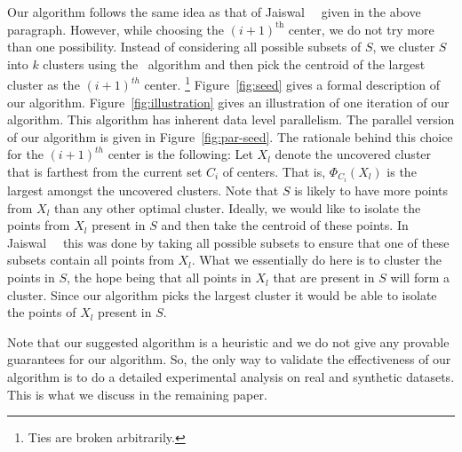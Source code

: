 \noindent
Our algorithm follows the same idea as that of Jaiswal~\etal\ \cite{jks} given in the above paragraph. 
However, while choosing the $(i+1)^{\textrm{th}}$ center, we do not try more than one possibility.
Instead of considering all possible subsets of $S$, we cluster $S$ into $k$ clusters using the \kmpp\ algorithm and then pick the centroid of the largest cluster as the $(i+1)^{th}$ center. 
\footnote{Ties are broken arbitrarily.}
Figure~\ref{fig:seed} gives a formal description of our algorithm. 
Figure~\ref{fig:illustration} gives an illustration of one iteration of our algorithm.
This algorithm has inherent data level parallelism. 
The parallel version of our algorithm is given in Figure~\ref{fig:par-seed}.
The rationale behind this choice for the $(i+1)^{th}$ center is the following: 
Let $X_l$ denote the uncovered cluster that is farthest from the current set $C_i$ of centers. That is, $\Phi_{C_i}(X_l)$ is the largest amongst the uncovered clusters. 
Note that $S$ is likely to have more points from $X_l$ than any other optimal cluster.
Ideally, we would like to isolate the points from $X_l$ present in $S$ and then take the centroid of these points. 
In Jaiswal~\etal\ \cite{jks} this was done by taking all possible subsets to ensure that one of these subsets contain all points from $X_l$. 
What we essentially do here is to cluster the points in $S$, the hope being that all points in $X_l$ that are present in $S$ will form a cluster.
Since our algorithm picks the largest cluster it would be able to isolate the points of $X_l$ present in $S$.

\noindent
Note that our suggested algorithm is a heuristic and we do not give any provable guarantees for our algorithm.
So, the only way to validate the effectiveness of our algorithm is to do a detailed experimental analysis on real and synthetic datasets. 
This is what we discuss in the remaining paper. 


